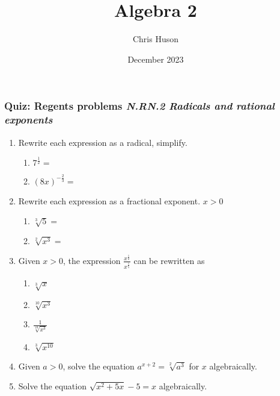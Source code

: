 \documentclass[12pt, twoside]{article}
\title{Algebra 2}
\author{Chris Huson}
\date{December 2023}
\begin{document}
\subsubsection*{Quiz: Regents problems \hfill \emph{N.RN.2 Radicals and rational exponents}}
\begin{enumerate}[itemsep=1.5cm]

\item Rewrite each expression as a radical, simplify.  \vspace{0.25cm}
\begin{multicols}{2}
  \begin{enumerate}[itemsep=1cm]
    \item $\displaystyle 7^{\frac{1}{2}}=$
    \item $\displaystyle (8x)^{-\frac{2}{3}}=$
  \end{enumerate}
  \end{multicols} \vspace{1cm}
  
\item Rewrite each expression as a fractional exponent. $x>0$  \vspace{0.25cm}
\begin{multicols}{2}
  \begin{enumerate}[itemsep=1cm]
      \item $\sqrt[3]{5} =$
      \item $\sqrt[2]{x^3} =$
  \end{enumerate}
  \end{multicols}

\item Given $x > 0$, the expression $\displaystyle \frac{x^{\frac{1}{2}}}{x^{\frac{1}{5}}}$ can be rewritten as %
\begin{enumerate}
    \item $\sqrt[3]{x}$
    \item $\sqrt[10]{x^3}$
    \item $\displaystyle \frac{1}{\sqrt[10]{x^3}}$
    \item $\sqrt[3]{x^{10}}$
\end{enumerate}

\item Given $a > 0$, solve the equation $a^{x+2} = \sqrt[2]{a^3}$ for $x$ algebraically. %

\newpage
\item Solve the equation $\sqrt{x^2+5x} - 5 = x$ algebraically. %


\end{enumerate}
\end{document}
